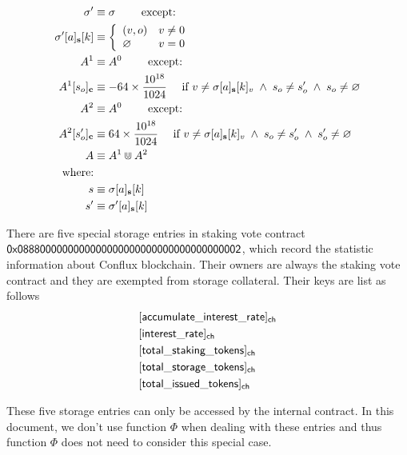 \begin{align}
	\mathbf{\sigma}'   &\equiv \mathbf{\sigma} \qquad \mbox{  except:}\\ 
	\mathbf{\sigma}'[a]_{\bf s}[k] &\equiv\left\{
		\begin{array}{ll}
			(v,o) & v\neq 0\\
			\varnothing & v= 0\\
		\end{array}
	\right.\\
	A^1 &\equiv A^0  \qquad \mbox{  except:}\\ 
	A^1[s_o]_{\bf c} &\equiv - 64 \times \frac{10^{18}}{1024} \quad \mbox{ if } v\neq \mathbf{\sigma}[a]_{\bf s}[k]_v \;\wedge\; s_o\neq s'_o \;\wedge\; s_o\neq\varnothing \\ 
	A^2 &\equiv A^0  \qquad \mbox{  except:}\\ 
	A^2[s'_o]_{\bf c} &\equiv 64 \times \frac{10^{18}}{1024} \quad \mbox{ if }v\neq \mathbf{\sigma}[a]_{\bf s}[k]_v \;\wedge\; s_o\neq s'_o \;\wedge\; s'_o\neq\varnothing \\ 
	A &\equiv A^1\Cup A^2 \\
	\text{where:} & \\
	s &\equiv \mathbf{\sigma}[a]_{\bf s}[k] \\
	s' &\equiv \mathbf{\sigma}'[a]_{\bf s}[k] 
\end{align}

There are five special storage entries in staking vote contract ${\sf 0x0888000000000000000000000000000000000002}$, which record the statistic information about Conflux blockchain. Their owners are always the staking vote contract and they are exempted from storage collateral. Their keys are list as follows 
\begin{align}
	& \sf [accumulate\char`_interest\char`_rate]_{\sf ch} \\ 
	& \sf [interest\char`_rate]_{\sf ch} \\
    & \sf [total\char`_staking\char`_tokens]_{\sf ch} \\
    & \sf [total\char`_storage\char`_tokens]_{\sf ch} \\
    & \sf [total\char`_issued\char`_tokens]_{\sf ch} 
\end{align}

These five storage entries can only be accessed by the internal contract. In this document, we don't use function $\Phi$ when dealing with these entries and thus function $\Phi$ does not need to consider this special case. 
